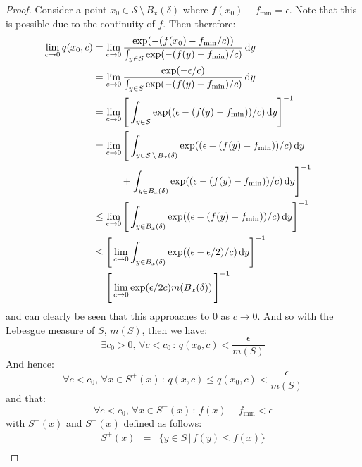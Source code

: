 \begin{theorem}
\begin{proof}
\noindent Consider a point $x_0 \in \mathcal{S} \, \setminus \, B_x(\delta)$ where $f(x_0) - f_{\min} = \epsilon$. 
Note that this is possible due to the continuity of $f$. Then therefore:
\begin{align}
    \lim_{c \rightarrow 0} q(x_0, c) & = \lim_{c \rightarrow 0} \dfrac{\exp(-(f(x_0)-f_{\min}/c))}{\int_{y \in \mathcal{S}} \exp(-(f(y)-f_{\min})/c)} \, \dd y & \notag \\
    & = \lim_{c \rightarrow 0} \dfrac{\exp(-\epsilon/c)}{\int_{y \in S} \exp(-(f(y)-f_{\min})/c)} \, \dd y & \notag \\
    & = \lim_{c \rightarrow 0} \Bigg[ \int_{y \in \mathcal{S}} \exp((\epsilon-(f(y)-f_{\min}))/c) \, \dd y \Bigg]^{-1} & \notag \\
    & = \lim_{c \rightarrow 0} \Bigg[ \int_{y \in \mathcal{S} \, \setminus \, B_x(\delta)} \exp((\epsilon-(f(y)-f_{\min}))/c) \, \dd y  & \notag \\
    & \hspace{10mm} + \int_{y \in B_x(\delta)} \exp((\epsilon-(f(y)-f_{\min}))/c) \, \dd y  \Bigg]^{-1} & \notag \\
    & \leq \lim_{c \rightarrow 0} \Bigg[ \int_{y \in B_x(\delta)} \exp((\epsilon-(f(y)-f_{\min}))/c) \, \dd y  \Bigg]^{-1} & \notag \\
    & \leq \Bigg[ \lim_{c \rightarrow 0}  \int_{y \in B_x(\delta)} \exp((\epsilon-\epsilon/2)/c) \, \dd y  \Bigg]^{-1} & \notag \\
    & = \Bigg[ \lim_{c \rightarrow 0}   \exp(\epsilon/2c)m(B_x(\delta)) \,  \Bigg]^{-1} &
\end{align}
and can clearly be seen that this approaches to 0 as $c \rightarrow 0$. And so with the Lebesgue measure of $S$, $m(S)$, then we have:
\begin{equation}
    \exists c_0 > 0, \, \forall c < c_0 \, : \, q(x_0, c) < \dfrac{\epsilon}{m(S)}
\end{equation}
And hence:
\begin{equation}
   \forall c < c_0, \, \forall x \in S^+ (x) \, : \, q(x,c) \leq q(x_0, c) < \dfrac{\epsilon}{m(S)}
\end{equation}
and that:
\begin{equation}
    \forall c < c_0, \, \forall x \in S^- (x) \, : \, f(x) - f_{\min} < \epsilon
\end{equation}
with $S^+(x)$ and $S^-(x)$ defined as follows:
\begin{eqnarray}
    S^+(x) & = & \{ y \in S \, | \, f(y) \leq f(x) \} \\

\end{eqnarray}
\end{proof}
\end{theorem}
